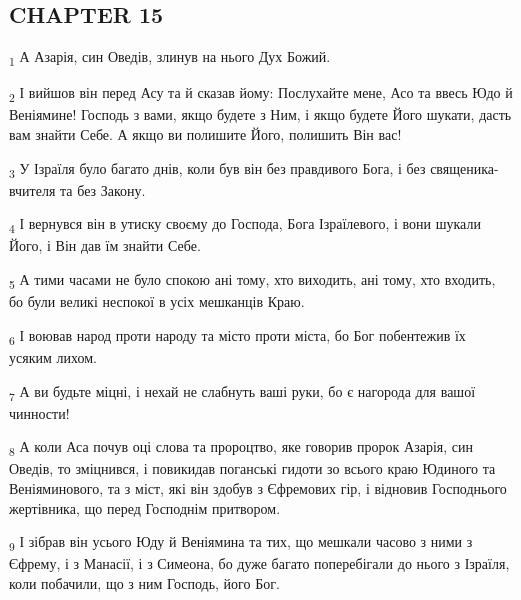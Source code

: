 \subsection{CHAPTER 15}
\begin{tcolorbox}
\textsubscript{1} А Азарія, син Оведів, злинув на нього Дух Божий.
\end{tcolorbox}
\begin{tcolorbox}
\textsubscript{2} І вийшов він перед Асу та й сказав йому: Послухайте мене, Асо та ввесь Юдо й Веніямине! Господь з вами, якщо будете з Ним, і якщо будете Його шукати, дасть вам знайти Себе. А якщо ви полишите Його, полишить Він вас!
\end{tcolorbox}
\begin{tcolorbox}
\textsubscript{3} У Ізраїля було багато днів, коли був він без правдивого Бога, і без священика-вчителя та без Закону.
\end{tcolorbox}
\begin{tcolorbox}
\textsubscript{4} І вернувся він в утиску своєму до Господа, Бога Ізраїлевого, і вони шукали Його, і Він дав їм знайти Себе.
\end{tcolorbox}
\begin{tcolorbox}
\textsubscript{5} А тими часами не було спокою ані тому, хто виходить, ані тому, хто входить, бо були великі неспокої в усіх мешканців Краю.
\end{tcolorbox}
\begin{tcolorbox}
\textsubscript{6} І воював народ проти народу та місто проти міста, бо Бог побентежив їх усяким лихом.
\end{tcolorbox}
\begin{tcolorbox}
\textsubscript{7} А ви будьте міцні, і нехай не слабнуть ваші руки, бо є нагорода для вашої чинности!
\end{tcolorbox}
\begin{tcolorbox}
\textsubscript{8} А коли Аса почув оці слова та пророцтво, яке говорив пророк Азарія, син Оведів, то зміцнився, і повикидав поганські гидоти зо всього краю Юдиного та Веніяминового, та з міст, які він здобув з Єфремових гір, і відновив Господнього жертівника, що перед Господнім притвором.
\end{tcolorbox}
\begin{tcolorbox}
\textsubscript{9} І зібрав він усього Юду й Веніямина та тих, що мешкали часово з ними з Єфрему, і з Манасії, і з Симеона, бо дуже багато поперебігали до нього з Ізраїля, коли побачили, що з ним Господь, його Бог.
\end{tcolorbox}
